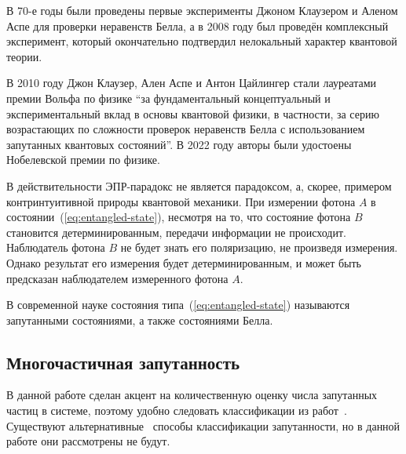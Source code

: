 В 70-е годы были проведены первые эксперименты\cite{Alain1976} Джоном Клаузером и Аленом Аспе для проверки неравенств Белла,
а в 2008 году был проведён комплексный эксперимент\cite{Scheidl2010},
который окончательно подтвердил нелокальный характер квантовой теории.

В 2010 году Джон Клаузер, Ален Аспе и Антон Цайлингер стали лауреатами премии Вольфа по физике ``за фундаментальный концептуальный и экспериментальный вклад в основы квантовой физики, в частности, за серию возрастающих по сложности проверок неравенств Белла с использованием запутанных квантовых состояний''. В 2022 году авторы были удостоены Нобелевской премии по физике. 

В действительности  ЭПР-парадокс не является парадоксом,
а, скорее, примером контринтуитивной природы квантовой механики.
При измерении фотона $A$ в состоянии~(\ref{eq:entangled-state}),
несмотря на то, что состояние фотона $B$ становится детерминированным,
передачи информации не происходит.
Наблюдатель фотона $B$ не будет знать его поляризацию,
не произведя измерения.
Однако результат его измерения будет детерминированным,
и может быть предсказан наблюдателем измеренного фотона $A$.

В современной науке состояния типа~(\ref{eq:entangled-state}) называются запутанными состояниями, а также состояниями Белла.


\subsection{Многочастичная запутанность}


В данной работе сделан акцент на количественную оценку числа запутанных частиц в системе,
поэтому удобно следовать классификации из работ~\cite{Seevinck2001, Toth2005, Bancal2009, Chen2005, Guhne2005, Guhne2006}.
Существуют альтернативные~\cite{Dur1999, Dur2000} способы классификации запутанности,
но в данной работе они рассмотрены не будут.

